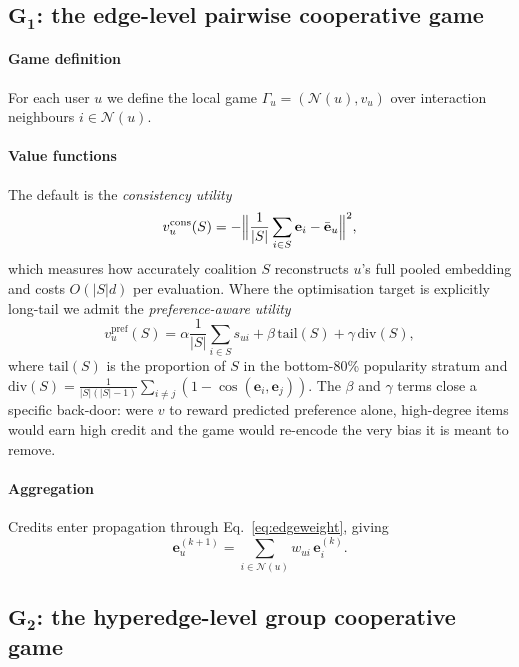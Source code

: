 \documentclass[final,5p,times,twocolumn]{elsarticle}
\begin{document}
\subsection{$\mathbf{G_1}$: the edge-level pairwise cooperative game}
\label{sec:g1}

\paragraph{Game definition}
For each user $u$ we define the local game $\Gamma_u = (\mathcal{N}(u), v_u)$
over interaction neighbours $i \in \mathcal{N}(u)$.

\paragraph{Value functions}
The default is the \emph{consistency utility}
\begin{equation}
v_u^{\mathrm{cons}}(S) = -\Bigl\lVert \frac{1}{|S|}
\sum_{i \in S} \mathbf{e}_i - \bar{\mathbf{e}}_u \Bigr\rVert^2 ,
\label{eq:vcons}
\end{equation}
which measures how accurately coalition $S$ reconstructs $u$'s full pooled
embedding and costs $O(|S|d)$ per evaluation. Where the optimisation target is
explicitly long-tail we admit the \emph{preference-aware utility}
\begin{equation}
v_u^{\mathrm{pref}}(S) = \alpha \frac{1}{|S|} \!\sum_{i \in S}\! s_{ui}
+ \beta \,\mathrm{tail}(S) + \gamma \,\mathrm{div}(S),
\label{eq:vpref}
\end{equation}
where $\mathrm{tail}(S)$ is the proportion of $S$ in the bottom-80\%
popularity stratum and $\mathrm{div}(S) = \frac{1}{|S|(|S|-1)}\sum_{i \neq j}
(1 - \cos(\mathbf{e}_i,\mathbf{e}_j))$. The $\beta$ and $\gamma$ terms close a
specific back-door: were $v$ to reward predicted preference alone, high-degree
items would earn high credit and the game would re-encode the very bias it is
meant to remove.

\paragraph{Aggregation}
Credits enter propagation through Eq.~\eqref{eq:edgeweight}, giving
\begin{equation}
\mathbf{e}_u^{(k+1)} = \sum_{i \in \mathcal{N}(u)} w_{ui}\,
\mathbf{e}_i^{(k)} .
\end{equation}

\subsection{$\mathbf{G_2}$: the hyperedge-level group cooperative game}
\label{sec:g2}
\end{document}
